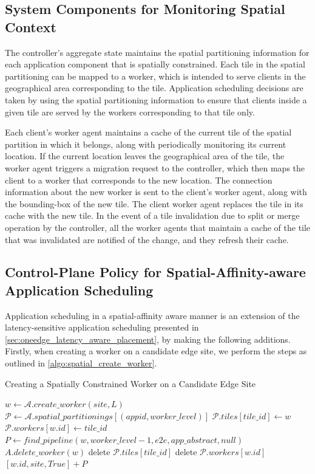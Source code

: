 \subsection{System Components for Monitoring Spatial Context}

The controller's aggregate state maintains the spatial partitioning information for each application component that is spatially constrained. Each tile in the spatial partitioning can be mapped to a worker, which is intended to serve clients in the geographical area corresponding to the tile. Application scheduling decisions are taken by using the spatial partitioning information to ensure that clients inside a given tile are served by the workers corresponding to that tile only. 
\par Each client's worker agent maintains a cache of the current tile of the spatial partition in which it belongs, along with periodically monitoring its current location. If the current location leaves the geographical area of the tile, the worker agent triggers a migration request to the controller, which then maps the client to a worker that corresponds to the new location. The connection information about the new worker is sent to the client's worker agent, along with the bounding-box of the new tile. The client worker agent replaces the tile in its cache with the new tile. In the event of a tile invalidation due to split or merge operation by the controller, all the worker agents that maintain a cache of the tile that was invalidated are notified of the change, and they refresh their cache.

\subsection{Control-Plane Policy for Spatial-Affinity-aware Application Scheduling}
Application scheduling in a spatial-affinity aware manner is an extension of the latency-sensitive application scheduling presented in \cref{sec:oneedge_latency_aware_placement}, by making the following additions. Firstly, when creating a worker on a candidate edge site, we perform the steps as outlined in \cref{algo:spatial_create_worker}.

\begin{algorithm}
\caption{Creating a Spatially Constrained Worker on a Candidate Edge Site}
\label{algo:spatial_create_worker}
\begin{algorithmic}[1]
\State $w \gets \mathcal{A}.create\_worker \left( site, L\right)$
    \State $\mathcal{P} \gets \mathcal{A}.spatial\_partitionings [\left( appid, worker\_level\right) ]$
    \State $\mathcal{P}.tiles[tile\_id] \gets w$
    \State $\mathcal{P}.workers[w.id] \gets tile\_id$
\EndIf
\State $P \gets find\_pipeline \left( w, worker\_level - 1, e2e, app\_abstract, null\right)$
    \State $A.delete\_worker \left( w \right)$
    \State delete $\mathcal{P}.tiles[tile\_id]$
    \State delete $\mathcal{P}.workers[w.id]$
\Else
    \State \Return $[w.id, site, True] + P$
\EndIf
\end{algorithmic}
\end{algorithm}

